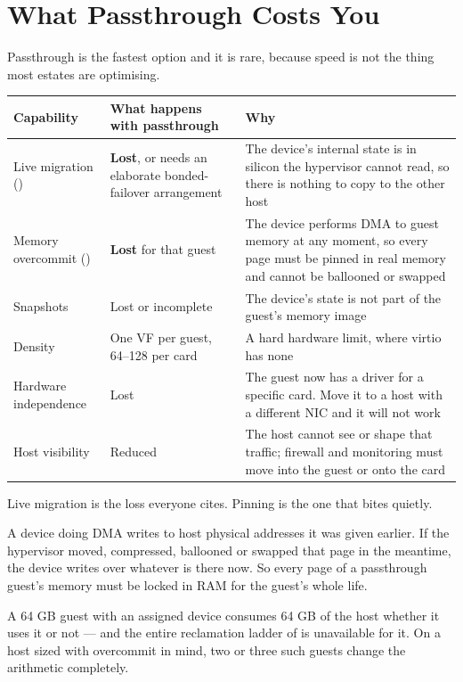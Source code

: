 \section{What Passthrough Costs You}

Passthrough is the fastest option and it is rare, because speed is not the
thing most estates are optimising.

\begin{longtable}{@{}L{4.2cm}L{5.1cm}L{5.4cm}@{}}
\toprule
{}
\textbf{Capability} & \textbf{What happens with passthrough} &
\textbf{Why} \\
\midrule
\endhead
Live migration () & \textbf{Lost}, or needs an elaborate
bonded-failover arrangement & The device's internal state is in silicon the
hypervisor cannot read, so there is nothing to copy to the other host \\
Memory overcommit () & \textbf{Lost} for that guest & The device
performs DMA to guest memory at any moment, so every page must be pinned in
real memory and cannot be ballooned or swapped \\
Snapshots & Lost or incomplete & The device's state is not part of the guest's
memory image \\
Density & One VF per guest, 64--128 per card & A hard hardware limit, where
virtio has none \\
Hardware independence & Lost & The guest now has a driver for a specific card.
Move it to a host with a different NIC and it will not work \\
Host visibility & Reduced & The host cannot see or shape that traffic; firewall
and monitoring must move into the guest or onto the card \\
\bottomrule
\end{longtable}

\begin{alertbox}
Live migration is the loss everyone cites. Pinning is the one that bites
quietly.

\smallskip
A device doing DMA writes to host physical addresses it was given earlier. If
the hypervisor moved, compressed, ballooned or swapped that page in the
meantime, the device writes over whatever is there now. So every page of a
passthrough guest's memory must be locked in RAM for the guest's whole life.

\smallskip
A 64 GB guest with an assigned device consumes 64 GB of the host whether it
uses it or not --- and the entire reclamation ladder of  is
unavailable for it. On a host sized with overcommit in mind, two or three such
guests change the arithmetic completely.
\end{alertbox}

